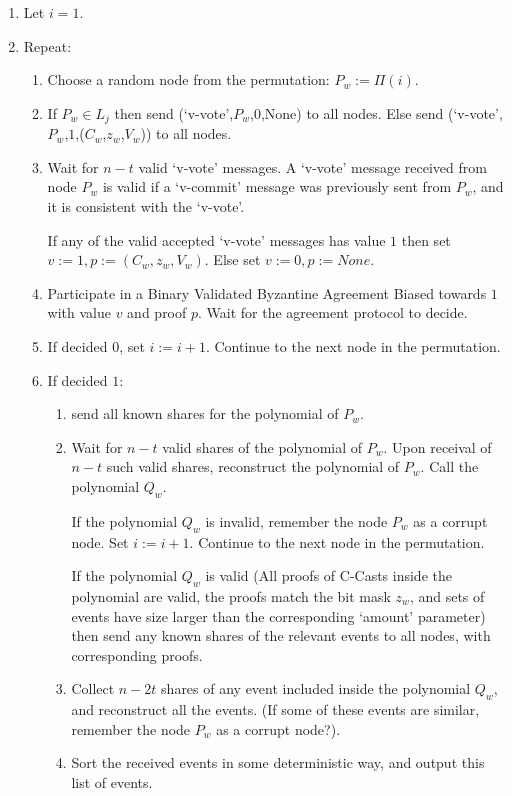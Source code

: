 \begin{enumerate}
\begin{enumerate}
    \item Let $i = 1$.
    \item Repeat:
      \begin{enumerate}
        \item Choose a random node from the permutation: $P_w := {\Pi}(i)$.
        \item If $P_w \in L_j$ then send (`v-vote',$P_w$,$0$,None) to all nodes.
          Else send (`v-vote',$P_w$,$1$,($C_w$,$z_w$,$V_w$)) to all nodes.
        \item Wait for $n-t$ valid `v-vote' messages. A `v-vote' message
          received from node $P_w$ is valid if a `v-commit' message was
          previously sent from $P_w$, and it is consistent with the `v-vote'.
          
          If any of the valid accepted `v-vote' messages has value $1$ then set
          $v := 1, p:= (C_w,z_w,V_w)$. Else set $v := 0, p:= None$.

        \item Participate in a Binary Validated Byzantine Agreement Biased
          towards $1$ with value $v$ and proof $p$. Wait for the agreement
          protocol to decide.
        \item If decided $0$, set $i := i + 1$. Continue to the next node in the
          permutation.
        \item If decided $1$:
        \begin{enumerate}
          \item send all known shares for the polynomial of $P_w$.
          \item Wait for $n-t$ valid shares of the polynomial of $P_w$. Upon
            receival of $n-t$ such valid shares, reconstruct the polynomial of
            $P_w$. Call the polynomial $Q_w$.

            If the polynomial $Q_w$ is invalid, remember the node $P_w$ as a
            corrupt node. Set $i := i + 1$. Continue to the next node in the
            permutation.

            If the polynomial $Q_w$ is valid (All proofs of C-Casts inside the
            polynomial are valid, the proofs match the bit mask $z_w$, and
            sets of events have size larger than the corresponding `amount'
            parameter) then send any known shares of the relevant events to all
            nodes, with corresponding proofs. 
            
          \item Collect $n-2t$ shares of any event included inside the
            polynomial $Q_w$, and reconstruct all the events. (If some of these
            events are similar, remember the node $P_w$ as a corrupt node?).

          \item Sort the received events in some deterministic way, and output
            this list of events.
       
        \end{enumerate}
      \end{enumerate}
  \end{enumerate}
\end{enumerate}
